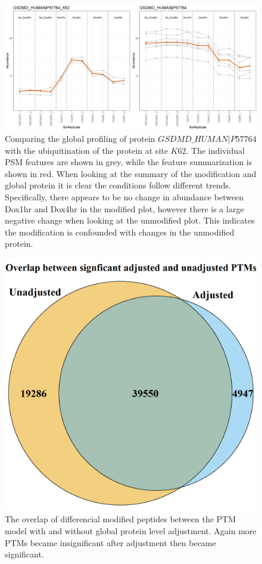 \documentclass[mcp]{article}
\numberwithin{figure}{section} %
\numberwithin{table}{section}
\begin{document}
\begin{figure}[ht]
\centering
\includegraphics[width=1\textwidth]{images/IpaH_prof_plot.png}
\caption{Comparing the global profiling of protein $GSDMD\_HUMAN|P57764$ with the ubiquitination of the protein at site $K62$. The individual PSM features are shown in grey, while the feature summarization is shown in red. When looking at the summary of the modification and global protein it is clear the conditions follow different trends. Specifically, there appears to be no change in abundance between Dox1hr and Dox4hr in the modified plot, however there is a large negative change when looking at the unmodified plot. This indicates the modification is confounded with changes in the unmodified protein.}
\label{fig:ipah_profile}
\end{figure}

\begin{figure}[h!]
\centering
\includegraphics[height=.65\textwidth]{images/shig_venn_diagramm.png}
\caption{The overlap of differencial modified peptides between the PTM model with and without global protein level adjustment. Again more PTMs became insignificant after adjustment then became significant.}
\label{fig:shig_venn_d}
\end{figure}
\end{document}
